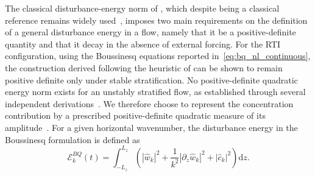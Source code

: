 The classical disturbance-energy norm of \citet{chu-1965}, which despite being a classical reference remains widely used~\citep{schmidt-et-al-2018,towne-schmidt-colonious-2018}, imposes two main requirements on the definition of a general disturbance energy in a flow, namely that it be a positive-definite quantity and that it decay in the absence of external forcing. For the RTI configuration, using the Boussinesq equations reported in~\eqref{eq:bq_nl_continuous}, the construction derived following the heuristic of \citet{hanifi-schmidt-henningson-1996} can be shown to remain positive definite only under stable stratification. No positive-definite quadratic energy norm exists for an unstably stratified flow, as established through several independent derivations~\citep{holliday-mcintyre-1981,shepherd-1993,winters-et-al-1995,roullet-klein-2009}. We therefore choose to represent the concentration contribution by a prescribed positive-definite quadratic measure of its amplitude~\citep{don-nils-amir-2013}. For a given horizontal wavenumber, the disturbance energy in the Boussinesq formulation is defined as
\begin{equation}
    \label{eq:bq_energy_norm_dz_k}
    \mathcal{E}_k^{BQ}(t) = \int_{-L_z}^{L_z}\left(|\hat{w}_k|^{2}+\frac{1}{k^{2}}\left|\partial_{z}\hat{w}_k\right|^{2}+|\hat{c}_k|^{2}\right)\mathrm{d}z.
\end{equation}

